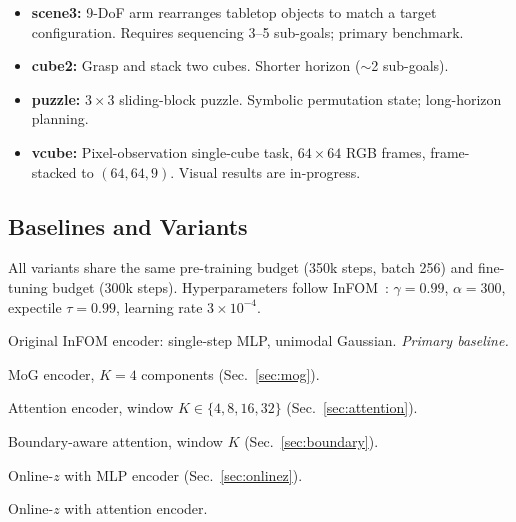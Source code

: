 \documentclass{article}
\newcommand{\base}{InFOM}
\begin{document}
\begin{itemize}\setlength\itemsep{1pt}
    \item \textbf{scene3:} 9-DoF arm rearranges tabletop objects
    to match a target configuration.
    Requires sequencing 3--5 sub-goals; primary benchmark.

    \item \textbf{cube2:} Grasp and stack two cubes.
    Shorter horizon ($\sim$2 sub-goals).

    \item \textbf{puzzle:} $3\times3$ sliding-block puzzle.
    Symbolic permutation state; long-horizon planning.

    \item \textbf{vcube:} Pixel-observation single-cube task,
    $64{\times}64$ RGB frames, frame-stacked to $(64,64,9)$.
    Visual results are in-progress.
\end{itemize}

\subsection{Baselines and Variants}
\label{sec:variants}

All variants share the same pre-training budget
(350k steps, batch 256) and fine-tuning budget (300k steps).
Hyperparameters follow \base{}~\cite{zheng2025infom}:
$\gamma=0.99$, $\alpha=300$, expectile $\tau=0.99$,
learning rate $3\times10^{-4}$.

\begin{description}\setlength\itemsep{1pt}
    \item[\textsc{MLP}] Original \base{} encoder:
    single-step MLP, unimodal Gaussian. \emph{Primary baseline.}

    \item[\textsc{MoG-4}] MoG encoder, $K=4$ components (Sec.~\ref{sec:mog}).

    \item[\textsc{Att-w$K$}] Attention encoder,
    window $K\in\{4,8,16,32\}$ (Sec.~\ref{sec:attention}).

    \item[\textsc{Bdy-w$K$}] Boundary-aware attention,
    window $K$ (Sec.~\ref{sec:boundary}).

    \item[\textsc{OZ-MLP}] Online-$z$ with MLP encoder (Sec.~\ref{sec:onlinez}).

    \item[\textsc{OZ-Att-w$K$}] Online-$z$ with attention encoder.
\end{description}
\end{document}
